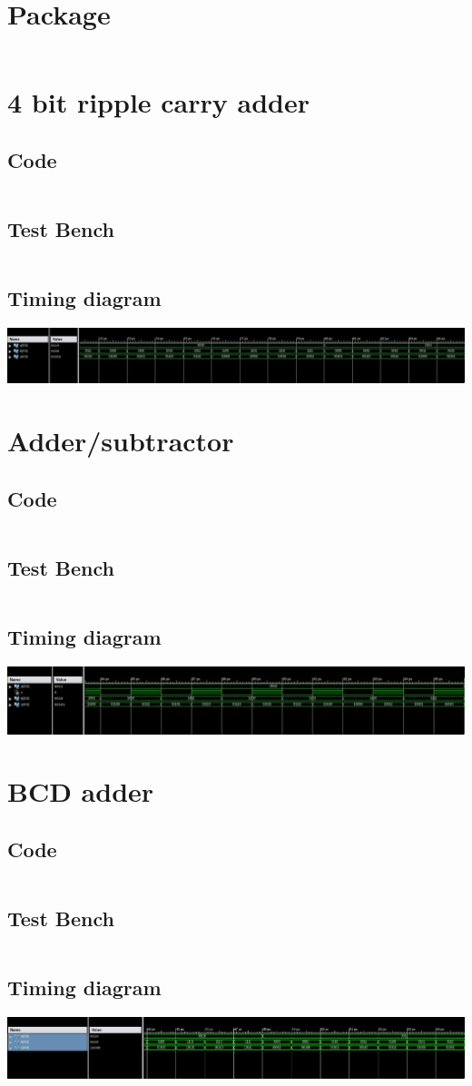 \documentclass[titlepage]{article}
\begin{document}
    \section{Package}
    \inputminted{vhdl}{./codes/adder_package.vhd}
    \section{4 bit ripple carry adder}
    \subsection{Code}
    \inputminted{vhdl}{./codes/a4_ax1.vhd}
    \subsection{Test Bench}
    \inputminted{vhdl}{./codes/tb_a4_ax1.vhd}
    \subsection{Timing diagram}
    \includegraphics[width=19cm]{./figures/ripple_carry_td.jpeg}
    \section{Adder/subtractor}
    \subsection{Code}
    \inputminted{vhdl}{./codes/a4_ax2.vhd}
    \subsection{Test Bench}
    \inputminted{vhdl}{./codes/tb_a4_ax2.vhd}
    \subsection{Timing diagram}
    \includegraphics[width=19cm]{./figures/adder_sub_td.jpeg}
    \section{BCD adder}
    \subsection{Code}
    \inputminted{vhdl}{./codes/a4_ax3.vhd}
    \subsection{Test Bench}
    \inputminted{vhdl}{./codes/tb_a4_ax3.vhd}
    \subsection{Timing diagram}
    \includegraphics[width=19cm]{./figures/bcd_td.jpeg}
\end{document}
